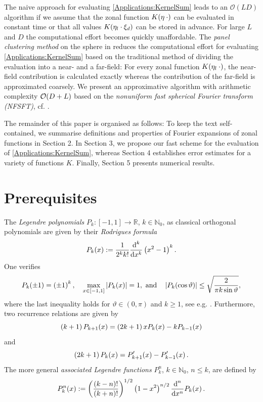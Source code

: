 \documentclass[11pt,a4paper,twoside,bibtotoc]{scrartcl}
\theoremstyle{plain}
\theoremstyle{definition}
\theoremstyle{remark}
\newcommand{\N}{\ensuremath{\mathbb{N}}}
\newcommand{\NZ}{\ensuremath{\mathbb{N}_{0}}}
\newcommand{\R}{\ensuremath{\mathbb{R}}}
\newcommand{\fun}[2]{\ensuremath{#1{\hspace{-0.4ex}}\left(#2\right)}}
\newcommand{\dx}{\text{\rm{d}}}
\numberwithin{equation}{section}
\numberwithin{table}{section}
\numberwithin{figure}{section}
\begin{document}
The naive approach for evaluating \eqref{Applications:KernelSum} leads to
an $\mathcal{O}\left(LD\right)$ algorithm if we assume that the zonal function
$\fun{K}{\mathbf{\eta} \: \cdot}$ can be evaluated in constant time or that all values
$\fun{K}{\mathbf{\eta}_{l} \cdot \mathbf{\xi}_{d}}$ can be stored in advance. 
For large $L$ and $D$ the computational effort becomes quickly unaffordable.
The \emph{panel clustering method} on the sphere in \cite{FrGlSch98} reduces the
computational effort for evaluating \eqref{Applications:KernelSum} based on the
traditional method of dividing the evaluation into a near- and a far-field:
For every zonal function $\fun{K}{\mathbf{\eta}_l \: \cdot}$, the near-field
contribution is calculated exactly whereas the contribution of the far-field
is approximated coarsely.
We present an approximative algorithm with arithmetic complexity 
${\cal O} (D+L)$ based on the \emph{nonuniform fast spherical Fourier 
transform (NFSFT)}, cf. \cite{kupo02}. 

The remainder of this paper is organised as follows:
To keep the text self-contained, we summarise definitions and properties
of Fourier expansions of zonal functions in Section 2.
In Section 3, we propose our fast scheme for the evaluation of
\eqref{Applications:KernelSum}, whereas Section 4 establishes
error estimates for a variety of functions $K$.
Finally, Section 5 presents numerical results.

\section{Prerequisites} \label{sect:2}
The \emph{Legendre polynomials} $P_k : [-1,1] \rightarrow \R$, $k \in
\N_{0}$, as classical orthogonal polynomials are given by their
\emph{Rodrigues formula} 
\[
\fun{P_k}{x} := \frac{1}{2^k k!} \frac{\dx^k}{\dx x^k} \left(x^2-1\right)^k.
\]
One verifies
\begin{equation}\label{leg_prop}
\fun{P_{k}}{\pm1} = \left(\pm1\right)^{k}, \quad
\max_{x \in [-1,1]} \left|\fun{P_{k}}{x}\right| = 1,\text{ and} \quad
\left|\fun{P_{k}}{\cos\vartheta}\right| \le \sqrt{\frac{2}{\pi k
    \sin\vartheta}},
\end{equation}
where the last inequality holds for $\vartheta \in (0,\pi)$ and $k \ge 1$, see
e.g. \cite[pp. 47]{niuv}.
Furthermore, two recurrence relations are given by
\begin{equation}\label{three1}
\left(k+1\right)\fun{P_{k+1}}{x} = \left(2k+1\right)x\fun{P_{k}}{x} - k\fun{P_{k-1}}{x}
\end{equation}
and
\begin{equation}\label{three2}
\left(2k+1\right) \fun{P_{k}}{x} = \fun{P_{k+1}'}{x} - \fun{P_{k-1}'}{x}.
\end{equation}
The more general \emph{associated Legendre functions} $P_{k}^n$, $k \in \NZ$, $n \le k$, are defined by
\[
  \fun{P_{k}^n}{x} := \left(\frac{(k-n)!}{(k+n)!}\right)^{1/2} 
  \left(1-x^2\right)^{n/2} \frac{\dx^n}{\dx x^n} \fun{P_{k}}{x}.
\]
\end{document}
